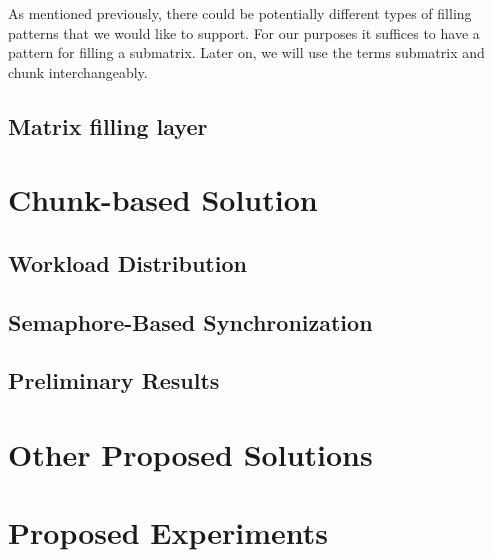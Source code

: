 \documentclass[journal]{IEEEtran}
\begin{document}
As mentioned previously, there could be potentially different types of filling patterns that we would like to support. For our purposes it suffices to have a pattern for filling a submatrix. Later on, we will use the terms submatrix and chunk interchangeably.  

\subsection{Matrix filling layer}

\section{Chunk-based Solution}


\subsection{Workload Distribution}

\subsection{Semaphore-Based Synchronization}

\subsection{Preliminary Results}


\section{Other Proposed Solutions}



\section{Proposed Experiments}


\end{document}
